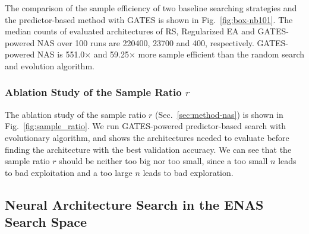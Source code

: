 \documentclass[runningheads]{llncs}
\begin{document}
The comparison of the sample efficiency of two baseline searching strategies and the predictor-based method with GATES is shown in Fig.~\ref{fig:box-nb101}.
The median counts of evaluated architectures of RS, Regularized EA and GATES-powered NAS over 100 runs are 220400, 23700 and 400, respectively.
GATES-powered NAS is 551.0$\times$ and 59.25$\times$ more sample efficient than the random search and evolution algorithm.

\subsubsection{Ablation Study of the Sample Ratio $r$}
The ablation study of the sample ratio $r$ (Sec.~\ref{sec:method-nas}) is shown in Fig.~\ref{fig:sample_ratio}.
We run GATES-powered predictor-based search with evolutionary algorithm, and shows the architectures needed to evaluate before finding the architecture with the best validation accuracy. 
We can see that the sample ratio $r$ should be neither too big nor too small, since a too small $n$ leads to bad exploitation and a too large $n$ leads to bad exploration.


\subsection{Neural Architecture Search in the ENAS Search Space}
\label{sec:exp-nas-enas}
\end{document}
